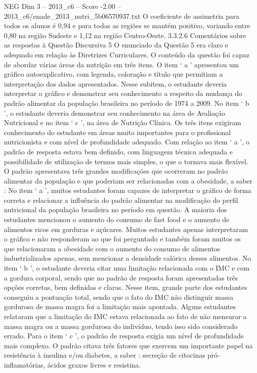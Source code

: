 \begin{textsample}{NEG Dim 3 – 2013\_c6 – Score -2.00 – 2013\_c6/enade\_2013\_nutri\_5b06570937.txt}
O coeficiente de assimetria para todos os alunos é 0,94 e para todas as regiões se mantém positivo, variando entre 0,80 na região Sudeste e 1,12 na região Centro-Oeste. 3.3.2.6 Comentários sobre as respostas à Questão Discursiva 5 O enunciado da Questão 5 era claro e adequado em relação às Diretrizes Curriculares.
O conteúdo da questão foi capaz de abordar várias áreas da nutrição em três itens.
O item ‘ a ’ apresentou um gráfico autoexplicativo, com legenda, coloração e título que permitiam a interpretação dos dados apresentados.
Nesse subitem, o estudante deveria interpretar o gráfico e demonstrar seu conhecimento a respeito da mudança do padrão alimentar da população brasileira no período de 1974 a 2009.
No item ‘ b ’, o estudante deveria demonstrar seu conhecimento na área de Avaliação Nutricional e no item ‘ c ’, na área de Nutrição Clínica.
Os três itens exigiram conhecimento do estudante em áreas muito importantes para o profissional nutricionista e com nível de profundidade adequado.
Com relação ao item ‘ a ’, o padrão de resposta estava bem definido, com linguagem técnica adequada e possibilidade de utilização de termos mais simples, o que o tornava mais flexível.
O padrão apresentava três grandes modificações que ocorreram no padrão alimentar da população e que poderiam ser relacionadas com a obesidade, a saber : No item ‘ a ’, muitos estudantes foram capazes de interpretar o gráfico de forma correta e relacionar a influência do padrão alimentar na modificação do perfil nutricional da população brasileira no período em questão.
A maioria dos estudantes mencionou o aumento do consumo de fast food e o aumento de alimentos ricos em gorduras e açúcares.
Muitos estudantes apenas interpretaram o gráfico e não responderam ao que foi perguntado e também foram muitos os que relacionaram a obesidade com o aumento do consumo de alimentos industrializados apenas, sem mencionar a densidade calórica desses alimentos.
No item ‘ b ’, o estudante deveria citar uma limitação relacionada com o IMC e com a gordura corporal, sendo que no padrão de resposta foram apresentadas três opções corretas, bem definidas e claras.
Nesse item, grande parte dos estudantes conseguiu a pontuação total, sendo que o fato do IMC não distinguir massa gordurosa de massa magra foi a limitação mais apontada.
Alguns estudantes relataram que a limitação do IMC estava relacionada ao fato de não mensurar a massa magra ou a massa gordurosa do indivíduo, tendo isso sido considerado errado.
Para o item ‘ c ’, o padrão de resposta exigia um nível de profundidade mais complexo.
O padrão citava três fatores que exercem um importante papel na resistência à insulina e/ou diabetes, a saber : secreção de citocinas pró-inflamatórias, ácidos graxos livres e resistina.

\end{textsample}
